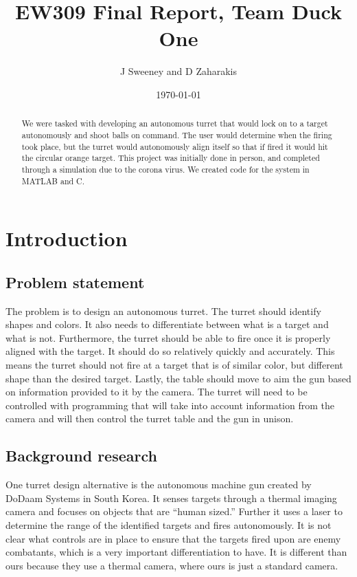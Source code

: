\documentclass{article}
\title{EW309 Final Report, Team Duck One}
\author{J Sweeney and D Zaharakis}
\date{\today}
\begin{document}
\maketitle
\begin{abstract}
We were tasked with developing an autonomous turret that would lock on to a target autonomously and shoot balls on command. The user would determine when the firing took place, but the turret would autonomously align itself so that if fired it would hit the circular orange target. This project was initially done in person, and  completed through a simulation due to the corona virus. We created code for the system in MATLAB and C.
\end{abstract}

\section{Introduction}

\subsection{Problem statement}
The problem is to design an autonomous turret. The turret should identify shapes and colors. It also needs to differentiate between what is a target and what is not. Furthermore, the turret should be able to fire once it is properly aligned with the target. It should do so relatively quickly and accurately. This means the turret should not fire at a target that is of similar color, but different shape than the desired target. Lastly, the table should move to aim the gun based on information provided to it by the camera. The turret will need to be controlled with programming that will take into account information from the camera and will then control the turret table and the gun in unison. 

\subsection{Background research}
One turret design alternative is the autonomous machine gun created by DoDaam Systems in South Korea. It senses targets through a thermal imaging camera and focuses on objects that are “human sized.” Further it uses a laser to determine the range of the identified targets and fires autonomously. It is not clear what controls are in place to ensure that the targets fired upon are enemy combatants, which is a very important differentiation to have. It is different than ours because they use a thermal camera, where ours is just a standard camera.
\end{document}
